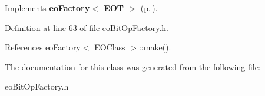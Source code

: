 Implements {\bf eo\-Factory$<$ EOT $>$} {\rm (p.\,\pageref{classeo_factory_a0})}.

Definition at line 63 of file eo\-Bit\-Op\-Factory.h.

References eo\-Factory$<$ EOClass $>$::make().

The documentation for this class was generated from the following file:\begin{CompactItemize}
\item 
eo\-Bit\-Op\-Factory.h\end{CompactItemize}
